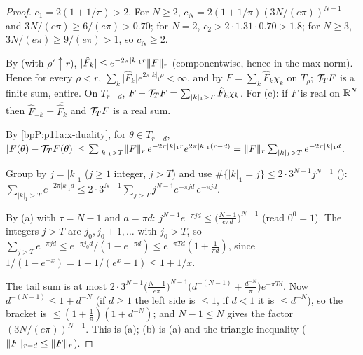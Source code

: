 \begin{proof}
\label{stepP:p11a:fc-const} $c_1=2(1+1/\pi)>2$. For $N\ge2$, $c_N=2(1+1/\pi)(3N/(e\pi))^{N-1}$ and $3N/(e\pi)\ge6/(e\pi)>0.70$; for $N=2$, $c_2>2\cdot1.31\cdot0.70>1.8$; for $N\ge3$, $3N/(e\pi)\ge9/(e\pi)>1$, so $c_N\ge2$.

\label{stepP:p11a:fc-decay} By  (with $\rho'\uparrow r$), $\lvert\hat F_k\rvert\le e^{-2\pi\lvert k\rvert_1r}\lVert F\rVert_{r}$ (componentwise, hence in the max norm). Hence for every $\rho<r$, $\sum_k\lvert\hat F_k\rvert e^{2\pi\lvert k\rvert_1\rho}<\infty$, and by  $F=\sum_k\hat F_k\chi_k$ on $T_\rho$; $\mathcal T_TF$ is a finite sum, entire. On $T_{r-d}$, $F-\mathcal T_TF=\sum_{\lvert k\rvert_1>T}\hat F_k\chi_k$. For (c): if $F$ is real on $\mathbb{R}^N$ then $\hat F_{-k}=\overline{\hat F_k}$ and $\mathcal T_TF$ is a real sum.

\label{stepP:p11a:fc-tail} By \ref{bpP:p11a:x-duality}, for $\theta\in T_{r-d}$,
$\lvert F(\theta)-\mathcal T_TF(\theta)\rvert\le\sum_{\lvert k\rvert_1>T}\lVert F\rVert_{r}\,e^{-2\pi\lvert k\rvert_1r}e^{2\pi\lvert k\rvert_1(r-d)}=\lVert F\rVert_{r}\sum_{\lvert k\rvert_1>T}e^{-2\pi\lvert k\rvert_1d}$.

\label{stepP:p11a:fc-count} Group by $j=\lvert k\rvert_1$ ($j\ge1$ integer, $j>T$) and use $\#\{\lvert k\rvert_1=j\}\le2\cdot3^{N-1}j^{N-1}$ ():
$\sum_{\lvert k\rvert_1>T}e^{-2\pi\lvert k\rvert_1d}\le2\cdot3^{N-1}\sum_{j>T}j^{N-1}e^{-\pi jd}\,e^{-\pi jd}$.

\label{stepP:p11a:fc-poly} By (a) with $\tau=N-1$ and $a=\pi d$: $j^{N-1}e^{-\pi jd}\le\bigl(\frac{N-1}{e\pi d}\bigr)^{N-1}$ (read $0^0=1$). The integers $j>T$ are $j_0,j_0+1,\dots$ with $j_0>T$, so $\sum_{j>T}e^{-\pi jd}\le e^{-\pi j_0d}/(1-e^{-\pi d})\le e^{-\pi Td}(1+\frac1{\pi d})$, since $1/(1-e^{-x})=1+1/(e^x-1)\le1+1/x$.

\label{stepP:p11a:fc-assemble} The tail sum is at most $2\cdot3^{N-1}\bigl(\frac{N-1}{e\pi}\bigr)^{N-1}\bigl(d^{-(N-1)}+\frac{d^{-N}}\pi\bigr)e^{-\pi Td}$. Now $d^{-(N-1)}\le1+d^{-N}$ (if $d\ge1$ the left side is $\le1$, if $d<1$ it is $\le d^{-N}$), so the bracket is $\le(1+\frac1\pi)(1+d^{-N})$; and $N-1\le N$ gives the factor $(3N/(e\pi))^{N-1}$. This is (a); (b) is (a) and the triangle inequality ($\lVert F\rVert_{r-d}\le\lVert F\rVert_{r}$).
\end{proof}

